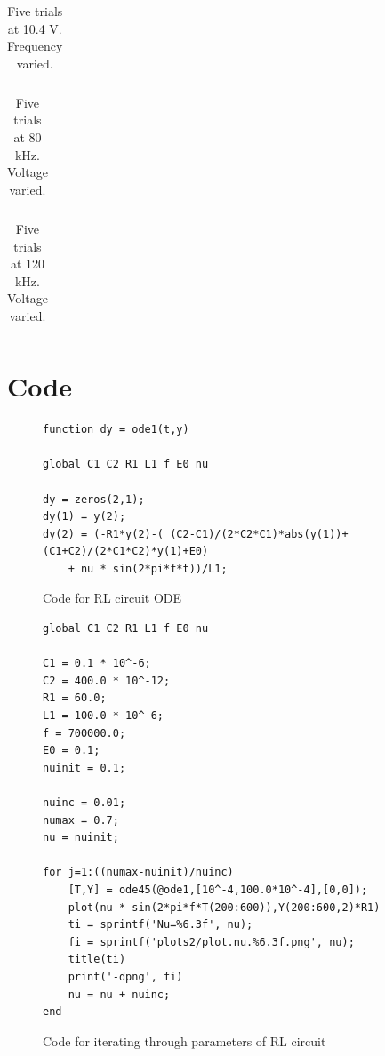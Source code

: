 \documentclass[12pt]{report}
\begin{document}
	\begin{table}
		\centering
		\begin{tabular}{|c|c|c|c|c|}
			\hline
			 
		\end{tabular}
		\label{tab:chaos3}
		\caption{Five trials at 10.4 V. Frequency varied.}
	\end{table}

	\begin{table}
		\centering
		\begin{tabular}{|l|l|l|l|l|l|l|l|l|l|l|l|}
			\hline
			 
		\end{tabular}
		\label{tab:chaos2}
		\caption{Five trials at 80 kHz. Voltage varied.}
	\end{table}
	
	\begin{table}
		\centering
		\begin{tabular}{|l|l|l|l|l|l|l|l|l|l|l|l|}
			\hline
			 
		\end{tabular}
		\label{tab:chaos2}
		\caption{Five trials at 120 kHz. Voltage varied.}
	\end{table}

\section{Code}
\label{sec: Code}

\begin{figure}[h]
\begin{lstlisting}
function dy = ode1(t,y)

global C1 C2 R1 L1 f E0 nu

dy = zeros(2,1);
dy(1) = y(2);
dy(2) = (-R1*y(2)-( (C2-C1)/(2*C2*C1)*abs(y(1))+ (C1+C2)/(2*C1*C2)*y(1)+E0)
	+ nu * sin(2*pi*f*t))/L1;
\end{lstlisting}
\label{code:ode}
\caption{Code for RL circuit ODE}
\end{figure}

\begin{figure}[h]
\begin{lstlisting}
global C1 C2 R1 L1 f E0 nu

C1 = 0.1 * 10^-6;
C2 = 400.0 * 10^-12;
R1 = 60.0;
L1 = 100.0 * 10^-6;
f = 700000.0;
E0 = 0.1;
nuinit = 0.1;

nuinc = 0.01;
numax = 0.7;
nu = nuinit;

for j=1:((numax-nuinit)/nuinc)
    [T,Y] = ode45(@ode1,[10^-4,100.0*10^-4],[0,0]);
    plot(nu * sin(2*pi*f*T(200:600)),Y(200:600,2)*R1)
    ti = sprintf('Nu=%6.3f', nu);
    fi = sprintf('plots2/plot.nu.%6.3f.png', nu);
    title(ti)
    print('-dpng', fi)
    nu = nu + nuinc;
end
\end{lstlisting}
	\label{code:run}
	\caption{Code for iterating through parameters of RL circuit}
\end{figure}
\end{document}
